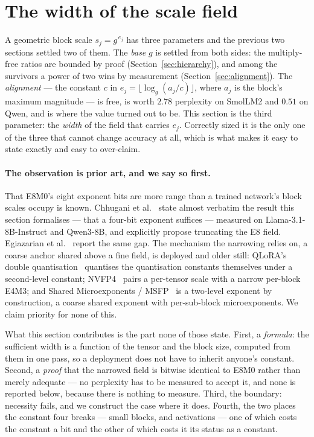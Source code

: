 \documentclass[11pt]{article}
\theoremstyle{definition}
\begin{document}
\section{The width of the scale field}
\label{sec:scalefield}\label{sec:scalewidth}

A geometric block scale $s_j = g^{\,e_j}$ has three parameters and the previous
two sections settled two of them. The \emph{base} $g$ is settled from both
sides: the multiply-free ratios are bounded by proof
(Section~\ref{sec:hierarchy}), and among the survivors a power of two wins by
measurement (Section~\ref{sec:alignment}). The \emph{alignment} --- the constant
$c$ in $e_j = \lfloor \log_g(a_j/c) \rfloor$, where $a_j$ is the block's maximum
magnitude --- is free, is worth $2.78$ perplexity on SmolLM2 and $0.51$ on Qwen,
and is where the value turned out to be. This section is the third parameter:
the \emph{width} of the field that carries $e_j$. Correctly sized it is the only
one of the three that cannot change accuracy at all, which is what makes it easy
to state exactly and easy to over-claim.

\paragraph{The observation is prior art, and we say so first.} That E8M0's eight
exponent bits are more range than a trained network's block scales occupy is
known. Chhugani et al.~\cite{chhugani} state almost verbatim the result
this section formalises --- that a four-bit exponent suffices --- measured on
Llama-3.1-8B-Instruct and Qwen3-8B, and explicitly propose truncating the E8
field. Egiazarian et al.~\cite{mxgap} report the same gap. The mechanism the
narrowing relies on, a coarse anchor shared above a fine field, is deployed and
older still: QLoRA's double quantisation~\cite{qlora} quantises the quantisation
constants themselves under a second-level constant; NVFP4~\cite{nvfp4} pairs a
per-tensor scale with a narrow per-block E4M3; and Shared Microexponents /
MSFP~\cite{msfp} is a two-level exponent by construction, a coarse shared
exponent with per-sub-block microexponents. We claim priority for none of this.

What this section contributes is the part none of those state. First, a
\emph{formula}: the sufficient width is a function of the tensor and the block
size, computed from them in one pass, so a deployment does not have to inherit
anyone's constant. Second, a \emph{proof} that the narrowed field is bitwise
identical to E8M0 rather than merely adequate --- no perplexity has to be
measured to accept it, and none is reported below, because there is nothing to
measure. Third, the boundary: necessity fails, and we construct the case where
it does. Fourth, the two places the constant four breaks --- small blocks, and
activations --- one of which costs the constant a bit and the other of which
costs it its status as a constant.
\end{document}

